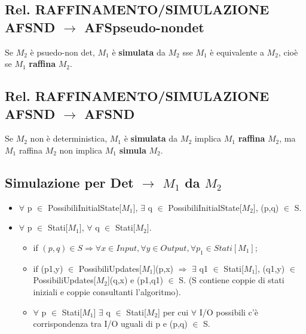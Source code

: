 \documentclass[a4paper]{article}
\begin{document}
\subsection{Rel. RAFFINAMENTO/SIMULAZIONE AFSND $\rightarrow$ AFSpseudo-nondet} Se $M_2$ è psuedo-non det, $M_1$ è \textbf{simulata} da $M_2$ sse $M_1$ è equivalente a $M_2$, cioè se $M_1$ \textbf{raffina} $M_2$.
\subsection{Rel. RAFFINAMENTO/SIMULAZIONE AFSND $\rightarrow$ AFSND} Se $M_2$ non è deterministica, $M_1$ è \textbf{simulata} da $M_2$ implica $M_1$ \textbf{raffina} $M_2$, ma $M_1$ raffina $M_2$ non implica $M_1$ \textbf{simula} $M_2$.
\subsection{Simulazione per Det $\rightarrow$ $M_1$ da $M_2$}
\begin{itemize}
\item $\forall$ p $\in$  PossibiliInitialState[$M_1$], $\exists$ q $\in$ PossibiliInitialState[$M_2$], (p,q) $\in$ S.
\item $\forall$ p $\in$  Stati[$M_1$], $\forall$ q $\in$ Stati[$M_2$].
\begin{itemize}
\item if $(p,q) \in S \Rightarrow \forall x \in Input, \forall y \in Output, \forall p_1 \in  Stati[M_1]$;
\item if (p1,y) $\in$ PossibiliUpdates[$M_1$](p,x) $\Rightarrow$ $\exists$ q1 $\in$ Stati[$M_1$], (q1,y) $\in$ PossibiliUpdates[$M_2$](q,x) e (p1,q1) $\in$ S. (S contiene coppie di stati iniziali e coppie consultanti l'algoritmo).
\item $\forall$ p $\in$ Stati[$M_1$] $\exists$ q $\in$ Stati[$M_2$] per cui $\forall$ I/O possibili c'è corrispondenza tra I/O uguali di p e (p,q) $\in$ S. 
\end{itemize}
\end{itemize}
\end{document}
